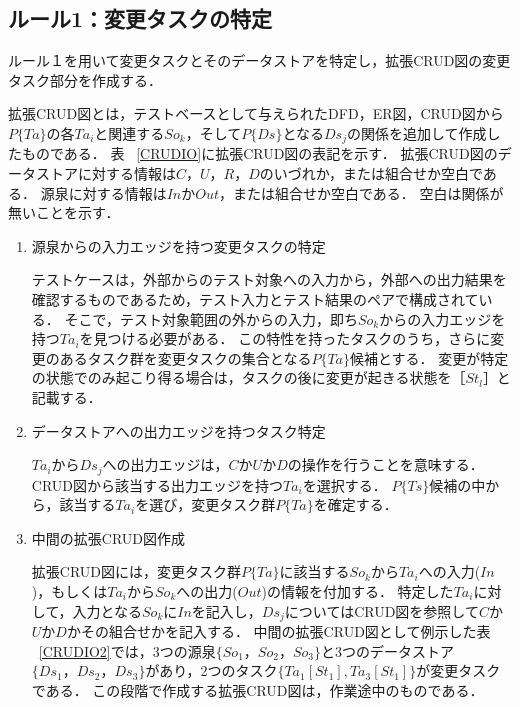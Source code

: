 \documentclass[a4paper,12pt]{jreport}
\begin{document}
\subsection{ルール1：変更タスクの特定}
ルール１を用いて変更タスクとそのデータストアを特定し，拡張CRUD図の変更タスク部分を作成する．

拡張CRUD図とは，テストベースとして与えられたDFD，ER図，CRUD図から$P\{Ta\}$の各$Ta_i$と関連する$So_k$，そして$P\{Ds\}$となる$Ds_j$の関係を追加して作成したものである．
表 ~\ref{CRUDIO}に拡張CRUD図の表記を示す．
拡張CRUD図のデータストアに対する情報は$C$，$U$，$R$，$D$のいづれか，または組合せか空白である．
源泉に対する情報は$In$か$Out$，または組合せか空白である．
空白は関係が無いことを示す．

\begin{enumerate}
\item 源泉からの入力エッジを持つ変更タスクの特定

テストケースは，外部からのテスト対象への入力から，外部への出力結果を確認するものであるため，テスト入力とテスト結果のペアで構成されている．
そこで，テスト対象範囲の外からの入力，即ち$So_k$からの入力エッジを持つ$Ta_i$を見つける必要がある．
この特性を持ったタスクのうち，さらに変更のあるタスク群を変更タスクの集合となる$P\{Ta\}$候補とする．
変更が特定の状態でのみ起こり得る場合は，タスクの後に変更が起きる状態を［$St_l$］と記載する．

\item データストアへの出力エッジを持つタスク特定

$Ta_i$から$Ds_j$への出力エッジは，$C$か$U$か$D$の操作を行うことを意味する．CRUD図から該当する出力エッジを持つ$Ta_i$を選択する．
$P\{Ts\}$候補の中から，該当する$Ta_i$を選び，変更タスク群$P\{Ta\}$を確定する．

\item 中間の拡張CRUD図作成

拡張CRUD図には，変更タスク群$P\{Ta\}$に該当する$So_k$から$Ta_i$への入力($In$)，もしくは$Ta_i$から$So_k$への出力($Out$)の情報を付加する．
特定した$Ta_i$に対して，入力となる$So_k$に$In$を記入し，$Ds_j$についてはCRUD図を参照して$C$か$U$か$D$かその組合せかを記入する．
中間の拡張CRUD図として例示した表 ~\ref{CRUDIO2}では，3つの源泉$\{So_1，So_2，So_3\}$と3つのデータストア$\{Ds_1，Ds_2，Ds_3\}$があり，2つのタスク$\{Ta_1[St_1],Ta_3[St_1]\}$が変更タスクである．
この段階で作成する拡張CRUD図は，作業途中のものである．

\end{enumerate}
\end{document}
